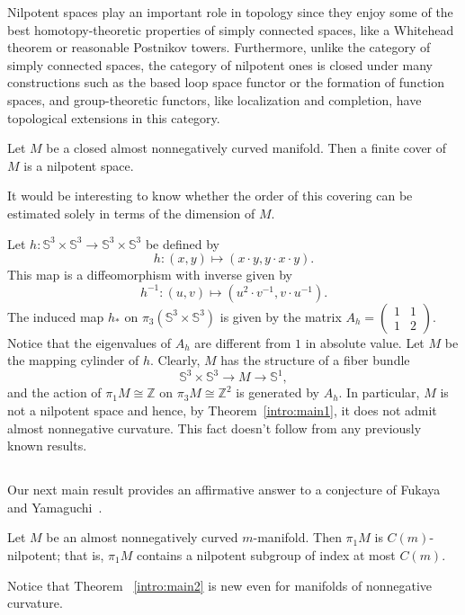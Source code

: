 \documentclass{amsart}
\begin{document}
Nilpotent spaces play an important role in topology
since they enjoy some of the best
homotopy-theoretic properties of simply connected spaces,
like a Whitehead theorem or reasonable Postnikov towers.
Furthermore, unlike the category of simply connected spaces,
the category of nilpotent ones is closed under
many constructions such as the based loop space functor
or the formation of function spaces,
and group-theoretic functors, like localization and completion,
have topological extensions in this category.

\begin{main}\label{intro:main1}
Let $M$ be a closed almost nonnegatively curved manifold.
Then a finite cover of $M$ is a nilpotent space.
\end{main}

It would be interesting to know
whether  the order of this covering
can be estimated solely in terms of the dimension of $M$.

\begin{ex}
Let  $h\colon \mathbb{S}^3 \times \mathbb{S}^3\to \mathbb{S}^3 \times \mathbb{S}^3$ be defined by
$$h\colon (x,y)\mapsto (x{\cdot} y,y{\cdot} x{\cdot} y).$$
This map  is a diffeomorphism with inverse given by
$$h^{-1}\colon (u,v)\mapsto (u^2{\cdot} v^{-1},v{\cdot} u^{-1}).$$
The induced map $h_*$ on $\pi_3(\mathbb{S}^3\times\mathbb{S}^3)$ is given by the matrix
$A_h=\left(\begin{smallmatrix} 1&1\\
1&2
\end{smallmatrix}\right)$.
Notice that the eigenvalues of $A_h$
are different from $1$ in absolute value.
Let $M$ be the mapping cylinder of $h$.
Clearly, $M$ has the structure of a fiber bundle 
\[\mathbb{S}^3 \times \mathbb{S}^3 \to M \to \mathbb{S}^{1},\] 
and the
action of $\pi_1M\cong\mathbb{Z}$ on $\pi_3M\cong \mathbb{Z}^2$
is generated by  $A_h$.
In particular, $M$ is not a nilpotent space and hence, by Theorem~\ref{intro:main1},
it does not admit almost nonnegative curvature.
This fact doesn't follow from any previously known results.
\end{ex}

\subsection{}
Our next main result provides an affirmative answer to a conjecture of Fukaya and Yamaguchi~\cite[Conjecture 0.15]{FY}.

\begin{main}\label{intro:main2}

Let $M$ be an almost nonnegatively curved $m$-manifold.
Then $\pi_1M$ is $C(m)$-nilpotent;
that is,
$\pi_1M$ contains a nilpotent subgroup of index at most $C(m)$.

\end{main}
Notice  that Theorem ~\ref{intro:main2} is new even
for manifolds of nonnegative curvature.
\end{document}
